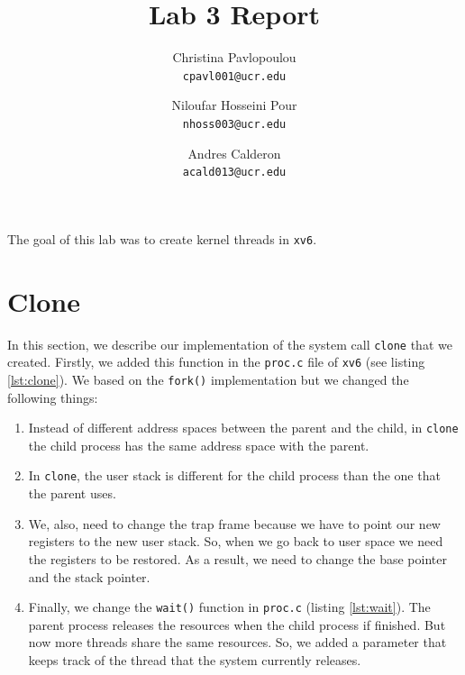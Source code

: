 \documentclass[10pt]{scrartcl}
\title{Lab 3 Report}
\author{
   Christina Pavlopoulou\\
  \small \texttt{cpavl001@ucr.edu}
  \and
   Niloufar Hosseini Pour\\
  \small \texttt{nhoss003@ucr.edu}
  \and
   Andres Calderon\\
  \small \texttt{acald013@ucr.edu}
}
\begin{document}
\maketitle

The goal of this lab was to create kernel threads in \texttt{xv6}. 

\section{Clone}
In this section, we describe our implementation of the system call \texttt{clone} that we created. Firstly, we added this function in the \texttt{proc.c} file of \texttt{xv6} (see listing \ref{lst:clone}). We based on the \texttt{fork()} implementation but we changed the following things:
\begin{enumerate}
\item Instead of different address spaces between the parent and the child, in \texttt{clone} the child process has the same address space with the parent. 
\item In \texttt{clone}, the user stack is different for the child process than the one that the parent uses. 
\item We, also, need to change the trap frame because we have to point our new registers to the new user stack. So, when we go back to user space we need the registers to be restored. As a result, we need to change the base pointer and the stack pointer. 
\item Finally, we change the \texttt{wait()} function in \texttt{proc.c} (listing \ref{lst:wait}). The parent process releases the resources when the child process if finished. But now more threads share the same resources. So, we added a parameter that keeps track of the thread that the system currently releases. 

\end{enumerate}


\end{document}
